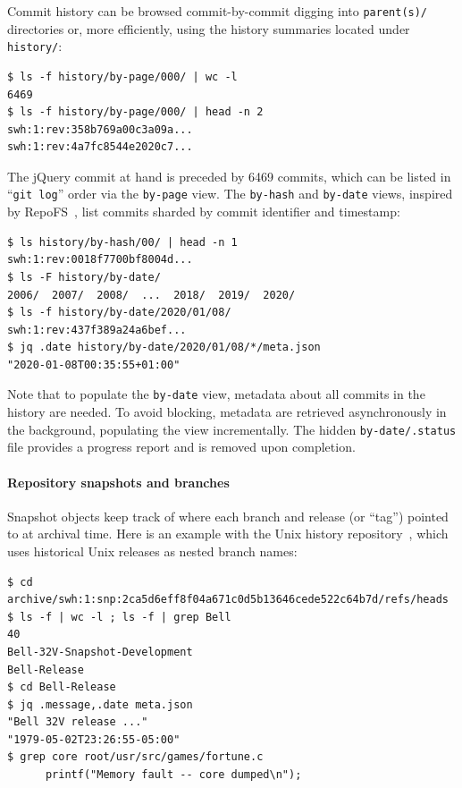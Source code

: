 Commit history can be browsed commit-by-commit digging into \texttt{parent(s)/}
directories or, more efficiently, using the history summaries located under
\texttt{history/}:

\begin{verbatim}
$ ls -f history/by-page/000/ | wc -l
6469
$ ls -f history/by-page/000/ | head -n 2
swh:1:rev:358b769a00c3a09a...
swh:1:rev:4a7fc8544e2020c7...
\end{verbatim}

The jQuery commit at hand is preceded by \num{6469} commits, which can be
listed in ``\texttt{git log}'' order via the \texttt{by-page} view. The
\texttt{by-hash} and \texttt{by-date} views, inspired by
RepoFS~\cite{spinellis2019repofs}, list commits sharded by commit identifier
and timestamp:

\begin{verbatim}
$ ls history/by-hash/00/ | head -n 1
swh:1:rev:0018f7700bf8004d...
$ ls -F history/by-date/
2006/  2007/  2008/  ...  2018/  2019/  2020/
$ ls -f history/by-date/2020/01/08/
swh:1:rev:437f389a24a6bef...
$ jq .date history/by-date/2020/01/08/*/meta.json
"2020-01-08T00:35:55+01:00"
\end{verbatim}

Note that to populate the \texttt{by-date} view, metadata about all commits in
the history are needed. To avoid blocking, metadata are retrieved asynchronously
in the background, populating the view incrementally. The hidden
\texttt{by-date/.status} file provides a progress report and is removed upon
completion.


\paragraph{Repository snapshots and branches}

Snapshot objects keep track of where each branch and release (or ``tag'')
pointed to at archival time. Here is an example with the Unix history
repository~\cite{SpinellisUnix2017}, which uses historical Unix releases as
nested branch names:

\begin{verbatim}
$ cd archive/swh:1:snp:2ca5d6eff8f04a671c0d5b13646cede522c64b7d/refs/heads
$ ls -f | wc -l ; ls -f | grep Bell
40
Bell-32V-Snapshot-Development
Bell-Release
$ cd Bell-Release
$ jq .message,.date meta.json
"Bell 32V release ..."
"1979-05-02T23:26:55-05:00"
$ grep core root/usr/src/games/fortune.c
      printf("Memory fault -- core dumped\n");
\end{verbatim}

